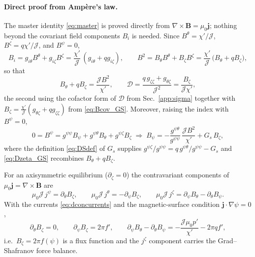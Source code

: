 \documentclass[10pt,a4paper]{article}
\numberwithin{equation}{section}
\begin{document}
\paragraph{Direct proof from Amp\`ere's law.}
The master identity \eqref{eq:master} is proved directly from
\(\nabla\times\mathbf B=\mu_0\mathbf j\); nothing beyond the covariant field
components $B_i$ is needed.  Since $B^\theta=\chi'/\mathcal J$,
$B^\zeta=q\chi'/\mathcal J$, and $B^\psi=0$,
\begin{equation}
B_i=g_{i\theta}B^\theta+g_{i\zeta}B^\zeta
=\frac{\chi'}{\mathcal J}\,(g_{i\theta}+qg_{i\zeta}),
\qquad
B^2=B_\theta B^\theta+B_\zeta B^\zeta
=\frac{\chi'}{\mathcal J}\,\big(B_\theta+qB_\zeta\big),
\label{eq:Bcov_GS}
\end{equation}
so that
\begin{equation}
B_\theta+qB_\zeta=\frac{\mathcal J B^2}{\chi'},
\qquad
\mathcal D
=\frac{q\,g_{\zeta\zeta}+g_{\theta\zeta}}{\mathcal J^2}
=\frac{B_\zeta}{\mathcal J\chi'},
\label{eq:Dzeta_GS}
\end{equation}
the second using the cofactor form of $\mathcal D$ from
Sec.~\ref{app:sigma} together with
$B_\zeta=\tfrac{\chi'}{\mathcal J}(g_{\theta\zeta}+qg_{\zeta\zeta})$
from \eqref{eq:Bcov_GS}.  Moreover, raising the index with $B^\psi=0$,
\begin{equation}
0=B^\psi=g^{\psi\psi}B_\psi+g^{\psi\theta}B_\theta+g^{\psi\zeta}B_\zeta
\;\Longrightarrow\;
B_\psi
=-\frac{g^{\psi\theta}}{g^{\psi\psi}}\,\frac{\mathcal J B^2}{\chi'}
+G_s\,B_\zeta ,
\label{eq:Bpsi_GS}
\end{equation}
where the definition \eqref{eq:DSdef} of $G_s$ supplies
$g^{\psi\zeta}/g^{\psi\psi}=q\,g^{\psi\theta}/g^{\psi\psi}-G_s$ and
\eqref{eq:Dzeta_GS} recombines $B_\theta+qB_\zeta$.

For an axisymmetric equilibrium ($\partial_\zeta=0$) the contravariant
components of $\mu_0\mathbf j=\nabla\times\mathbf B$ are
\begin{equation}
\mu_0\mathcal J\,j^\psi=\partial_\theta B_\zeta,
\qquad
\mu_0\mathcal J\,j^\theta=-\partial_\psi B_\zeta,
\qquad
\mu_0\mathcal J\,j^\zeta=\partial_\psi B_\theta-\partial_\theta B_\psi .
\end{equation}
With the currents \eqref{eq:dconcurrents} and the magnetic-surface condition
$\mathbf j\cdot\nabla\psi=0$,
\begin{equation}
\partial_\theta B_\zeta=0,
\qquad
\partial_\psi B_\zeta=2\pi f',
\qquad
\partial_\psi B_\theta-\partial_\theta B_\psi
=-\frac{\mathcal J\mu_0p'}{\chi'}-2\pi qf' ,
\label{eq:ampere_GS}
\end{equation}
i.e.\ $B_\zeta=2\pi f(\psi)$ is a flux function and the $j^\zeta$ component
carries the Grad--Shafranov force balance.
\end{document}
